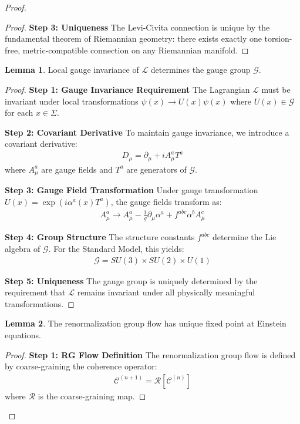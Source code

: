 \documentclass[11pt]{article}
\theoremstyle{definition}
\newtheorem{lemma}{Lemma}[section]
\newcommand{\coherence}{\mathcal{C}}
\newcommand{\configspace}{\Sigma}
\newcommand{\lagrangian}{\mathcal{L}}
\newcommand{\gaugegroup}{\mathcal{G}}
\begin{document}
\begin{proof}
\begin{proof}
\textbf{Step 3: Uniqueness}
The Levi-Civita connection is unique by the fundamental theorem of Riemannian geometry: there exists exactly one torsion-free, metric-compatible connection on any Riemannian manifold.
\end{proof}

\begin{lemma}
Local gauge invariance of $\lagrangian$ determines the gauge group $\gaugegroup$.
\end{lemma}
\begin{proof}
\textbf{Step 1: Gauge Invariance Requirement}
The Lagrangian $\lagrangian$ must be invariant under local transformations $\psi(x) \to U(x) \psi(x)$ where $U(x) \in \gaugegroup$ for each $x \in \configspace$.

\textbf{Step 2: Covariant Derivative}
To maintain gauge invariance, we introduce a covariant derivative:
\begin{align}
D_\mu = \partial_\mu + i A_\mu^a T^a
\end{align}
where $A_\mu^a$ are gauge fields and $T^a$ are generators of $\gaugegroup$.

\textbf{Step 3: Gauge Field Transformation}
Under gauge transformation $U(x) = \exp(i \alpha^a(x) T^a)$, the gauge fields transform as:
\begin{align}
A_\mu^a \to A_\mu^a - \frac{1}{g} \partial_\mu \alpha^a + f^{abc} \alpha^b A_\mu^c
\end{align}

\textbf{Step 4: Group Structure}
The structure constants $f^{abc}$ determine the Lie algebra of $\gaugegroup$. For the Standard Model, this yields:
\begin{align}
\gaugegroup = SU(3) \times SU(2) \times U(1)
\end{align}

\textbf{Step 5: Uniqueness}
The gauge group is uniquely determined by the requirement that $\lagrangian$ remains invariant under all physically meaningful transformations.
\end{proof}

\begin{lemma}
The renormalization group flow has unique fixed point at Einstein equations.
\end{lemma}
\begin{proof}
\textbf{Step 1: RG Flow Definition}
The renormalization group flow is defined by coarse-graining the coherence operator:
\begin{align}
\coherence^{(n+1)} = \mathcal{R}[\coherence^{(n)}]
\end{align}
where $\mathcal{R}$ is the coarse-graining map.


\end{proof}
\end{proof}
\end{document}
